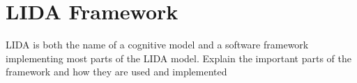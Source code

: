 \section{LIDA Framework}
\label{sec:lida}
LIDA is both the name of a cognitive model and a software framework implementing
most parts of the LIDA model.
Explain the important parts of the framework and how they are used and implemented